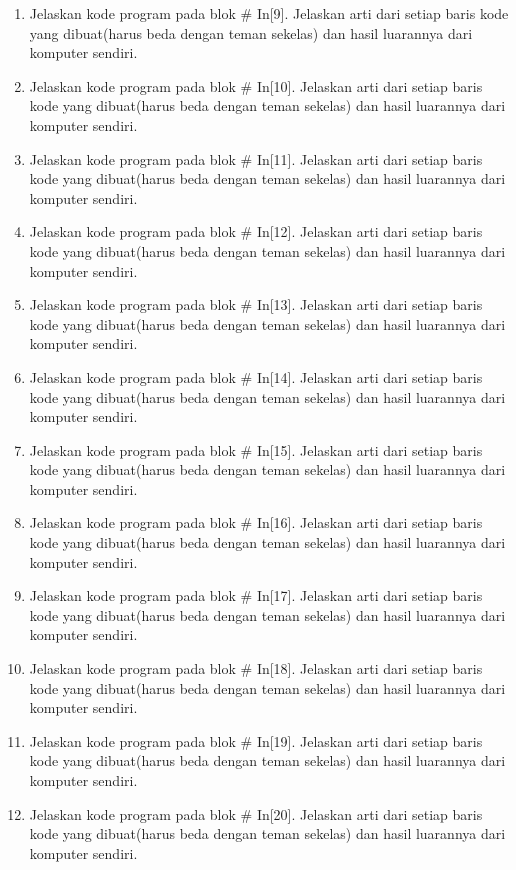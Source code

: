 \begin{enumerate}
\item Jelaskan kode program pada blok # In[9]. Jelaskan arti dari setiap baris kode yang dibuat(harus beda dengan teman sekelas) dan hasil luarannya dari komputer sendiri.

\item Jelaskan kode program pada blok # In[10]. Jelaskan arti dari setiap baris kode yang dibuat(harus beda dengan teman sekelas) dan hasil luarannya dari komputer sendiri.

\item Jelaskan kode program pada blok # In[11]. Jelaskan arti dari setiap baris kode yang dibuat(harus beda dengan teman sekelas) dan hasil luarannya dari komputer sendiri.

\item Jelaskan kode program pada blok # In[12]. Jelaskan arti dari setiap baris kode yang dibuat(harus beda dengan teman sekelas) dan hasil luarannya dari komputer sendiri.

\item Jelaskan kode program pada blok # In[13]. Jelaskan arti dari setiap baris kode yang dibuat(harus beda dengan teman sekelas) dan hasil luarannya dari komputer sendiri.

\item Jelaskan kode program pada blok # In[14]. Jelaskan arti dari setiap baris kode yang dibuat(harus beda dengan teman sekelas) dan hasil luarannya dari komputer sendiri.

\item Jelaskan kode program pada blok # In[15]. Jelaskan arti dari setiap baris kode yang dibuat(harus beda dengan teman sekelas) dan hasil luarannya dari komputer sendiri.

\item Jelaskan kode program pada blok # In[16]. Jelaskan arti dari setiap baris kode yang dibuat(harus beda dengan teman sekelas) dan hasil luarannya dari komputer sendiri.

\item Jelaskan kode program pada blok # In[17]. Jelaskan arti dari setiap baris kode yang dibuat(harus beda dengan teman sekelas) dan hasil luarannya dari komputer sendiri.

\item Jelaskan kode program pada blok # In[18]. Jelaskan arti dari setiap baris kode yang dibuat(harus beda dengan teman sekelas) dan hasil luarannya dari komputer sendiri.

\item Jelaskan kode program pada blok # In[19]. Jelaskan arti dari setiap baris kode yang dibuat(harus beda dengan teman sekelas) dan hasil luarannya dari komputer sendiri.

\item Jelaskan kode program pada blok # In[20]. Jelaskan arti dari setiap baris kode yang dibuat(harus beda dengan teman sekelas) dan hasil luarannya dari komputer sendiri.

\end{enumerate}


